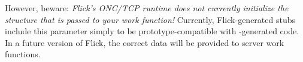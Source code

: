 However, beware: \emph{Flick's ONC/TCP runtime does not currently initialize
the structure that is passed to your work function!}  Currently,
Flick-generated stubs include this parameter simply to be prototype-compatible
with -generated code.  In a future version of Flick, the
correct  data will be provided to server work functions.




